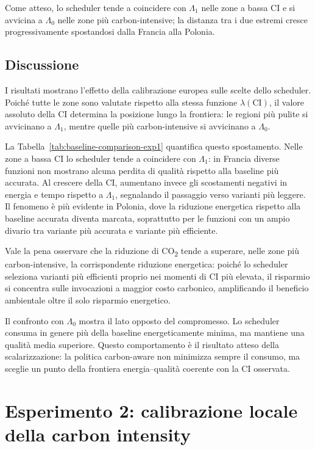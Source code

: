 Come atteso, lo scheduler tende a coincidere con $\Lambda_1$ nelle zone
a bassa CI e si avvicina a $\Lambda_0$ nelle zone più carbon-intensive;
la distanza tra i due estremi cresce progressivamente spostandosi dalla
Francia alla Polonia.

\subsection{Discussione}
\label{subsec:esperimento1-interpretazione}

I risultati mostrano l'effetto della calibrazione europea sulle scelte
dello scheduler. Poiché tutte le zone sono valutate rispetto alla stessa
funzione $\lambda(\mathrm{CI})$, il valore assoluto della CI determina la
posizione lungo la frontiera: le regioni più pulite si avvicinano a
$\Lambda_1$, mentre quelle più carbon-intensive si avvicinano a
$\Lambda_0$.

La Tabella~\ref{tab:baseline-comparison-exp1} quantifica questo
spostamento. Nelle zone a bassa CI lo scheduler tende a coincidere con
$\Lambda_1$: in Francia diverse funzioni non mostrano alcuna perdita di
qualità rispetto alla baseline più accurata. Al crescere della CI,
aumentano invece gli scostamenti negativi in energia e tempo rispetto a
$\Lambda_1$, segnalando il passaggio verso varianti più leggere. Il
fenomeno è più evidente in Polonia, dove la riduzione energetica rispetto
alla baseline accurata diventa marcata, soprattutto per le funzioni con
un ampio divario tra variante più accurata e variante più efficiente.

Vale la pena osservare che la riduzione di CO\textsubscript{2} tende a
superare, nelle zone più carbon-intensive, la corrispondente riduzione
energetica: poiché lo scheduler seleziona varianti più efficienti proprio
nei momenti di CI più elevata, il risparmio si concentra sulle
invocazioni a maggior costo carbonico, amplificando il beneficio
ambientale oltre il solo risparmio energetico.

Il confronto con $\Lambda_0$ mostra il lato opposto del compromesso. Lo
scheduler consuma in genere più della baseline energeticamente minima, ma
mantiene una qualità media superiore. Questo comportamento è il risultato
atteso della scalarizzazione: la politica carbon-aware non minimizza
sempre il consumo, ma sceglie un punto della frontiera energia--qualità
coerente con la CI osservata.

\section{Esperimento 2: calibrazione locale della carbon intensity}
\label{sec:esperimento2}

